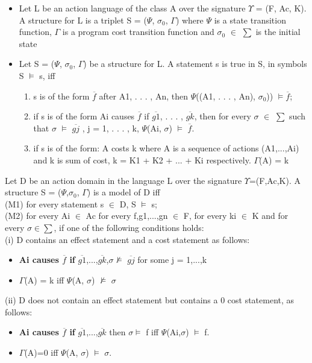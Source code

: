 \documentclass[11pt]{article}
\begin{document}
\begin{itemize}
\item 	Let L be an action language of the class A over the signature $\Upsilon$ = (F, Ac, K). A structure for L is a triplet S = ($\Psi$, $\sigma_{0}$, $\Gamma$) where $\Psi$ is a state transition function, $\Gamma$ is a program cost transition function  and $\sigma_{0}$ $\in$ $\sum$ is the initial state

\item 	Let S = ($\Psi$, $\sigma_{0}$, $\Gamma$) be a structure for L. A statement s is true in S, in symbols S   $\vDash$   s, iff 
\begin{enumerate}
\item s is of the form $\overline{f}$ after A1, . . . , An, then $\Psi$((A1, . . . , An), $\sigma_{0}$))   $\vDash \overline{f}$;

\item if s is of the form Ai causes $\overline{f}$ if $\overline{g1}$, . . . , $\overline{gk}$, then for every $\sigma$ $\in$ $\sum$ such that $\sigma$   $\vDash$   $\overline{gj}$ , j = 1, . . . , k, $\Psi$(Ai, $\sigma$)   $\vDash$   $\overline{f}$.

\item if s is of the form: A costs k where A is a sequence of actions (A1,...,Ai) and k is sum of cost, k = K1 + K2 + ... + Ki respectively. $\Gamma$(A) = k
\end{enumerate}
 

\end{itemize}
Let D be an action domain in the language L over the signature $\Upsilon$=(F,Ac,K). A structure S = ($\Psi$,$\sigma_{0}$, $\Gamma$) is a model of D iff\\
(M1) for every statement s $\in$ D, S $\vDash$ s;\\
(M2) for every Ai $\in$ Ac for every f,g1,...,gn $\in$ F, for every ki $\in$ K and for every $\sigma\in\sum$, if one of the following conditions holds:
\\
(i) D contains an effect statement and a cost statement as follows:
\begin{itemize}
	\item {\bfseries Ai causes $\overline{f}$ if} $\overline{g1}$,...,$\overline{gk}$,$\sigma \nvDash$  $\overline{gj}$ for some j = 1,...,k

	\item $\Gamma$(A) = k iff $\Psi$(A, $\sigma$) $\nvDash$ $\sigma$
\end{itemize}
(ii) D does not contain an effect statement but contains a 0 cost statement, as follows:
\begin{itemize}
\item {\bfseries Ai causes $\overline{f}$ if} $\overline{g1}$,...,$\overline{gk}$ then $\sigma \vDash$ f iff $\Psi$(Ai,$\sigma$) $\vDash$ f.

\item $\Gamma$(A)=0 iff $\Psi$(A, $\sigma$) $\vDash$ $\sigma$.
\end{itemize}
\end{document}
